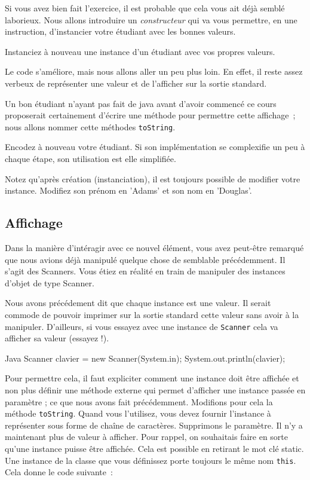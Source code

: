 \documentclass[a4paper,11pt]{article}
\begin{document}
	Si vous avez bien fait l'exercice, il est probable que cela vous ait déjà semblé laborieux. Nous allons introduire un \emph{constructeur} qui va vous permettre, en une instruction, d'instancier votre étudiant avec les bonnes valeurs.


	Instanciez à nouveau une instance d'un étudiant avec vos propres valeurs.

	Le code s'améliore, mais nous allons aller un peu plus loin. En effet, il reste assez verbeux de représenter une valeur et de l'afficher sur la sortie standard.

	Un bon étudiant n'ayant pas fait de java avant d'avoir commencé ce cours proposerait certainement d'écrire une méthode pour permettre cette affichage~; nous allons nommer cette méthodes \texttt{toString}.


	Encodez à nouveau votre étudiant. Si son implémentation se complexifie un peu à chaque étape, son utilisation est elle simplifiée.

	Notez qu'après création (instanciation), il est toujours possible de modifier votre instance. Modifiez son prénom en 'Adams' et son nom en 'Douglas'.


	\subsection{Affichage}

	Dans la manière d'intéragir avec ce nouvel élément, vous avez peut-être remarqué que nous avions déjà manipulé quelque chose de semblable précédemment. Il s'agit des Scanners. Vous étiez en réalité en train de manipuler des instances d'objet de type Scanner.

	Nous avons précédement dit que chaque instance est une valeur. Il serait commode de pouvoir imprimer sur la sortie standard cette valeur sans avoir à la manipuler. D'ailleurs, si vous essayez avec une instance de \texttt{Scanner} cela va afficher sa valeur (essayez !).
	\begin{Code}{Java}
		Scanner clavier = new Scanner(System.in);
		System.out.println(clavier);
	\end{Code}

	Pour permettre cela, il faut expliciter comment une instance doit être affichée et non plus définir une méthode externe qui permet d'afficher une instance passée en paramètre ; ce que nous avons fait précédemment. Modifions pour cela la méthode \texttt{toString}. Quand vous l'utilisez, vous devez fournir l'instance à représenter sous forme de chaîne de caractères. Supprimons le paramètre. Il n'y a maintenant plus de valeur à afficher. Pour rappel, on souhaitais faire en sorte qu'une instance puisse être affichée. Cela est possible en retirant le mot clé static. Une instance de la classe que vous définissez porte toujours le même nom \texttt{this}. Cela donne le code suivante~:
\end{document}
